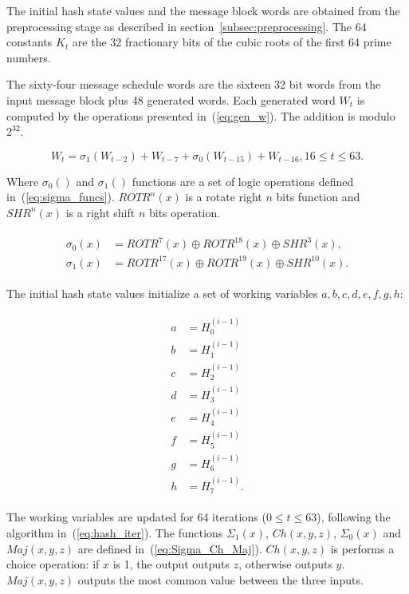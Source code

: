 The initial hash state values and the message block words are obtained from the 
preprocessing stage as described in section~\ref{subsec:preprocessing}.
The 64 constants $K_{t}$ are the 32 fractionary bits of the cubic roots of the
first 64 prime numbers.

The sixty-four message schedule words are the sixteen 32 bit words from the
input message block plus 48 generated words. Each generated word $W_{t}$ is
computed by the operations presented in~(\ref{eq:gen_w}). The addition is
modulo $2^{32}$.

\begin{equation}
    W_{t} = \sigma_{1}(W_{t-2}) + W_{t-7} + \sigma_{0}(W_{t-15}) + W_{t-16}, 16 \leq t \leq 63.
\label{eq:gen_w}
\end{equation}

Where $\sigma_{0}()$ and $\sigma_{1}()$ functions are a set of logic operations
defined in~(\ref{eq:sigma_funcs}). $ROTR^{n}(x)$ is a rotate right $n$ bits
function and $SHR^{n}(x)$ is a right shift $n$ bits operation.

\begin{align}
    \begin{split}
        \sigma_{0}(x) &= ROTR^{7}(x) \oplus ROTR^{18}(x) \oplus SHR^{3}(x), \\
        \sigma_{1}(x) &= ROTR^{17}(x) \oplus ROTR^{19}(x) \oplus SHR^{10}(x).
    \end{split}
\label{eq:sigma_funcs}
\end{align}

The initial hash state values initialize a set of working variables $a, b, c,
d, e, f, g, h$:

\begin{align}
    \begin{split}
        a &= H_{0}^{(i-1)} \\
        b &= H_{1}^{(i-1)} \\
        c &= H_{2}^{(i-1)} \\
        d &= H_{3}^{(i-1)} \\
        e &= H_{4}^{(i-1)} \\
        f &= H_{5}^{(i-1)} \\
        g &= H_{6}^{(i-1)} \\
        h &= H_{7}^{(i-1)}.
    \end{split}
\label{eq:init_state}
\end{align}

The working variables are updated for 64 iterations ($ 0 \leq t \leq 63$),
following the algorithm in~(\ref{eq:hash_iter}). The functions $\Sigma_1(x)$,
$Ch(x,y,z)$, $\Sigma_0(x)$ and $Maj(x,y,z)$ are defined
in~(\ref{eq:Sigma_Ch_Maj}). $Ch(x,y,z)$ is performs a choice operation: if $x$ 
is 1, the output outputs $z$, otherwise outputs $y$. $Maj(x,y,z)$ outputs the 
most common value between the three inputs.


